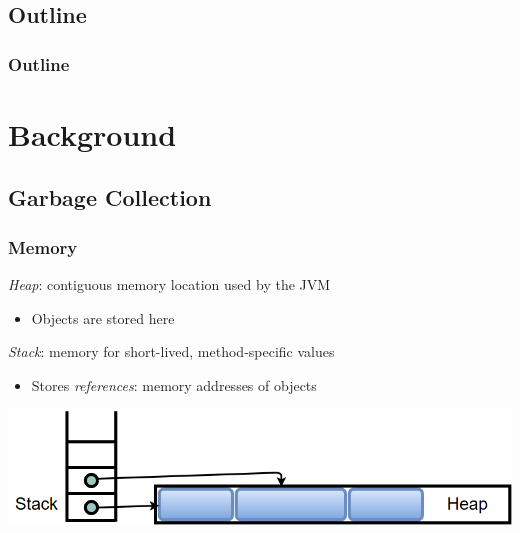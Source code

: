 \documentclass{beamer}
\newcommand{\linespace}{\vskip 0.25cm}
\begin{document}
\subsection*{Outline}

\begin{frame}
  \frametitle{Outline}
  \tableofcontents  
\end{frame}



\section[Background]{Background}

\subsection[GC Basics]{Garbage Collection}

\begin{frame}

\frametitle{Memory}

\emph{Heap}: contiguous memory location used by the JVM
\begin{itemize}
\item Objects are stored here
\end{itemize}

\linespace
\linespace

\emph{Stack}: memory for short-lived, method-specific values
\begin{itemize}
\item Stores \emph{references}: memory addresses of objects
\end{itemize}

\linespace
\linespace

\begin{center}
\includegraphics[width=.8\textwidth]{Illustrations/stack_and_heap.png}
\end{center}

\end{frame}
\end{document}
